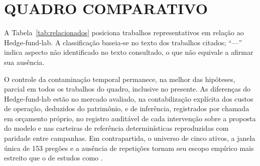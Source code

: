 \section{QUADRO COMPARATIVO}

A Tabela~\ref{tab:relacionados} posiciona trabalhos representativos em relação ao Hedge-fund-lab. A classificação baseia-se no texto dos trabalhos citados; ``---'' indica aspecto não identificado no texto consultado, o que não equivale a afirmar sua ausência.

O controle da contaminação temporal permanece, na melhor das hipóteses, parcial em todos os trabalhos do quadro, inclusive no presente. As diferenças do Hedge-fund-lab estão no mercado avaliado, na contabilização explícita dos custos de operação, deduzidos do patrimônio, e de inferência, registrados por chamada em orçamento próprio, no registro auditável de cada intervenção sobre a proposta do modelo e nas carteiras de referência determinísticas reproduzidas com paridade entre campanhas. Em contrapartida, o universo de cinco ativos, a janela única de 153 pregões e a ausência de repetições tornam seu escopo empírico mais estreito que o de estudos como \citet{FINSABER2026}.

